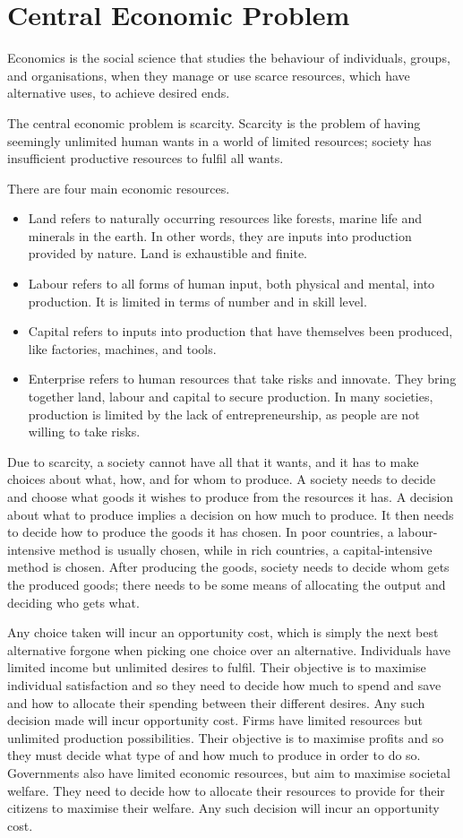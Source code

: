 \documentclass[Economics.tex]{subfiles}
\begin{document}
\chapter{Central Economic Problem}
Economics is the social science that studies the behaviour of individuals, groups, and organisations, when they manage or use scarce resources, which have alternative uses, to achieve desired ends.

The central economic problem is scarcity. Scarcity is the problem of having seemingly unlimited human wants in a world of limited resources; society has insufficient productive resources to fulfil all wants.

There are four main economic resources.
\begin{itemize}
    \item Land refers to naturally occurring resources like forests, marine life and minerals in the earth. In other words, they are inputs into production provided by nature. Land is exhaustible and finite.
    \item Labour refers to all forms of human input, both physical and mental, into production. It is limited in terms of number and in skill level.
    \item Capital refers to inputs into production that have themselves been produced, like factories, machines, and tools.
    \item Enterprise refers to human resources that take risks and innovate. They bring together land, labour and capital to secure production. In many societies, production is limited by the lack of entrepreneurship, as people are not willing to take risks.
\end{itemize}

Due to scarcity, a society cannot have all that it wants, and it has to make choices about what, how, and for whom to produce. A society needs to decide and choose what goods it wishes to produce from the resources it has. A decision about what to produce implies a decision on how much to produce. It then needs to decide how to produce the goods it has chosen. In poor countries, a labour-intensive method is usually chosen, while in rich countries, a capital-intensive method is chosen. After producing the goods, society needs to decide whom gets the produced goods; there needs to be some means of allocating the output and deciding who gets what.

Any choice taken will incur an opportunity cost, which is simply the next best alternative forgone when picking one choice over an alternative. Individuals have limited income but unlimited desires to fulfil. Their objective is to maximise individual satisfaction and so they need to decide how much to spend and save and how to allocate their spending between their different desires. Any such decision made will incur opportunity cost. Firms have limited resources but unlimited production possibilities. Their objective is to maximise profits and so they must decide what type of and how much to produce in order to do so. Governments also have limited economic resources, but aim to maximise societal welfare. They need to decide how to allocate their resources to provide for their citizens to maximise their welfare. Any such decision will incur an opportunity cost.
\end{document}
